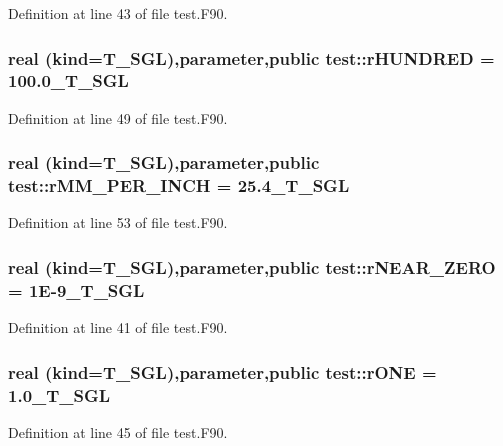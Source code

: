 Definition at line 43 of file test.F90.

\hypertarget{namespacetest_ae0e7b5cd24e302e72154de8cd84b911e}{
\subsubsection[{rHUNDRED}]{\setlength{\rightskip}{0pt plus 5cm}real (kind={\bf T\_\-SGL}),parameter,public {\bf test::rHUNDRED} = 100.0\_\-T\_\-SGL}}
\label{namespacetest_ae0e7b5cd24e302e72154de8cd84b911e}


Definition at line 49 of file test.F90.

\hypertarget{namespacetest_a63234032fe45a56340c75291af043fd0}{
\subsubsection[{rMM\_\-PER\_\-INCH}]{\setlength{\rightskip}{0pt plus 5cm}real (kind={\bf T\_\-SGL}),parameter,public {\bf test::rMM\_\-PER\_\-INCH} = 25.4\_\-T\_\-SGL}}
\label{namespacetest_a63234032fe45a56340c75291af043fd0}


Definition at line 53 of file test.F90.

\hypertarget{namespacetest_ad2e23effbad4134a648b3e3694400190}{
\subsubsection[{rNEAR\_\-ZERO}]{\setlength{\rightskip}{0pt plus 5cm}real (kind={\bf T\_\-SGL}),parameter,public {\bf test::rNEAR\_\-ZERO} = 1E-\/9\_\-T\_\-SGL}}
\label{namespacetest_ad2e23effbad4134a648b3e3694400190}


Definition at line 41 of file test.F90.

\hypertarget{namespacetest_a884b235687921d6a1682ba733422bc2a}{
\subsubsection[{rONE}]{\setlength{\rightskip}{0pt plus 5cm}real (kind={\bf T\_\-SGL}),parameter,public {\bf test::rONE} = 1.0\_\-T\_\-SGL}}
\label{namespacetest_a884b235687921d6a1682ba733422bc2a}


Definition at line 45 of file test.F90.

